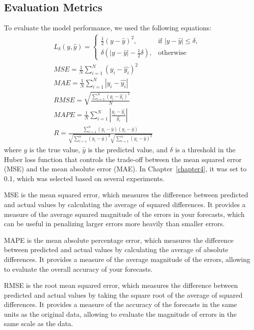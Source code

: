 \subsection{Evaluation Metrics}
\label{eval_appendix}
To evaluate the model performance, we used the following equations:
\begin{subequations}
\begin{gather}
    L_\delta (y, \hat{y}) = 
    \begin{cases}
    \frac{1}{2} (y - \hat{y})^2, & \text{if } |y - \hat{y}| \leq \delta,\\
    \delta (|y - \hat{y}| - \frac{1}{2} \delta), & \text{otherwise}
    \label{eq_huber}
    \end{cases}
    \\
    MSE = \frac{1}{N} \sum_{i=1}^{N} (y_i - \hat{y_i})^2\\ 
    MAE = \frac{1}{N} \sum_{i=1}^{N} |y_i - \hat{y_i}|\\ 
    RMSE = \sqrt{\frac{\sum_{i=1}^{N}(y_i - \hat{y_i})^2}{N}}\\ 
    MAPE = \frac{1}{N} \sum_{i=1}^{N} |\frac{y_i - \hat{y_i}}{\hat{y_i}}|\\ 
    R = \frac{\sum_{i=1}^n (y_i - \bar{y}) (y_i - \bar{y})}{\sqrt{\sum_{i=1}^n (y_i - \bar{y})^2} \sqrt{\sum_{i=1}^n (y_i - \bar{y})^2}}
\end{gather}
\label{eq_metrics}
\end{subequations}
where $y$ is the true value, $\hat{y}$ is the predicted value, and $\delta$ is a threshold in the Huber loss function that controls the trade-off between the mean squared error (MSE) and the mean absolute error (MAE). In Chapter~\ref{chapter4}, it was set to 0.1, which was selected based on several experiments.

MSE is the mean squared error, which measures the difference between predicted and actual values by calculating the average of squared differences. It provides a measure of the average squared magnitude of the errors in your forecasts, which can be useful in penalizing larger errors more heavily than smaller errors. 

MAPE is the mean absolute percentage error, which measures the difference between predicted and actual values by calculating the average of absolute differences. It provides a measure of the average magnitude of the errors, allowing to evaluate the overall accuracy of your forecasts. 

RMSE is the root mean squared error, which measures the difference between predicted and actual values by taking the square root of the average of squared differences. It provides a measure of the accuracy of the forecasts in the same units as the original data, allowing to evaluate the magnitude of errors in the same scale as the data. 


